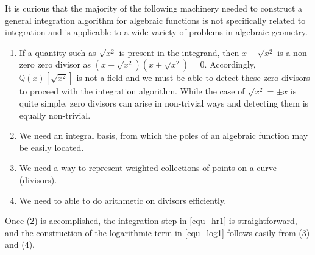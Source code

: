 \documentclass[12pt,reqno]{amsart}
\numberwithin{equation}{section}
\newcommand{\bbQ}[0]  { \mathbb{Q}}
\begin{document}
It is curious that the majority of the following machinery needed to construct a general integration algorithm for algebraic functions is not specifically related to integration and is applicable to a wide variety of problems in algebraic geometry.
\begin{enumerate}
 \item If a quantity such as $\sqrt{x^2}$ is present in the integrand, then $x-\sqrt{x^2}$ is a non-zero zero divisor as $(x-\sqrt{x^2})(x+\sqrt{x^2})=0$. Accordingly, $\bbQ(x)[\sqrt{x^2}]$ is not a field and we must be able to detect these zero divisors to proceed with the integration algorithm. While the case of $\sqrt{x^2}=\pm x$ is quite simple, zero divisors can arise in non-trivial ways and detecting them is equally non-trivial.
\item We need an integral basis, from which the poles of an algebraic function may be easily located.
\item We need a way to represent weighted collections of points on a curve (divisors).
\item We need to able to do arithmetic on divisors efficiently.
\end{enumerate}
Once (2) is accomplished, the integration step in \eqref{equ_hr1} is straightforward, and the construction of the logarithmic term in \eqref{equ_log1} follows easily from (3) and (4).
\end{document}

